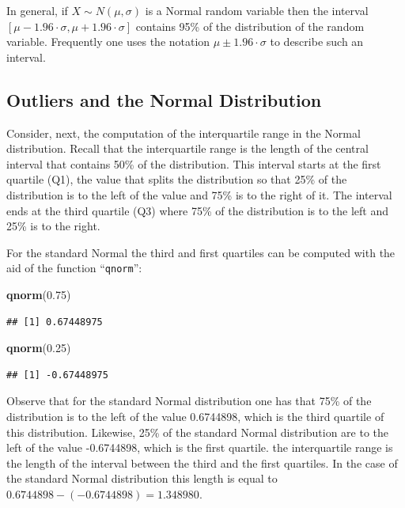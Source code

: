 \documentclass[]{krantz}
\makeatletter
\newenvironment{Shaded}{\begin{snugshade}}{\end{snugshade}}
\newcommand{\FloatTok}[1]{\textcolor[rgb]{0.00,0.00,0.81}{#1}}
\newcommand{\KeywordTok}[1]{\textcolor[rgb]{0.13,0.29,0.53}{\textbf{#1}}}
\newcommand{\NormalTok}[1]{#1}
\newenvironment{kframe}{%
\medskip{}
\setlength{\fboxsep}{.8em}
 \def\at@end@of@kframe{}%
 \ifinner\ifhmode%
  \def\at@end@of@kframe{\end{minipage}}%
  \begin{minipage}{\columnwidth}%
 \fi\fi%
 \def\FrameCommand##1{\hskip\@totalleftmargin \hskip-\fboxsep
 \colorbox{shadecolor}{##1}\hskip-\fboxsep
     \hskip-\linewidth \hskip-\@totalleftmargin \hskip\columnwidth}%
 \MakeFramed {\advance\hsize-\width
   \@totalleftmargin\z@ \linewidth\hsize
   \@setminipage}}%
 {\par\unskip\endMakeFramed%
 \at@end@of@kframe}
\renewenvironment{Shaded}{\begin{kframe}}{\end{kframe}}
\theoremstyle{definition}
\theoremstyle{definition}
\theoremstyle{definition}
\theoremstyle{remark}
\makeatother
\begin{document}
In general, if \(X \sim N(\mu,\sigma)\) is a Normal random variable then
the interval \([\mu - 1.96 \cdot \sigma, \mu + 1.96 \cdot \sigma]\)
contains 95\% of the distribution of the random variable. Frequently one
uses the notation \(\mu \pm 1.96 \cdot \sigma\) to describe such an
interval.

\hypertarget{outliers-and-the-normal-distribution}{%
\subsection{Outliers and the Normal Distribution}\label{outliers-and-the-normal-distribution}}

Consider, next, the computation of the interquartile range in the Normal
distribution. Recall that the interquartile range is the length of the
central interval that contains 50\% of the distribution. This interval
starts at the first quartile (Q1), the value that splits the
distribution so that 25\% of the distribution is to the left of the value
and 75\% is to the right of it. The interval ends at the third quartile
(Q3) where 75\% of the distribution is to the left and 25\% is to the
right.

For the standard Normal the third and first quartiles can be computed
with the aid of the function ``\texttt{qnorm}'':

\begin{Shaded}
\begin{Highlighting}[]
\KeywordTok{qnorm}\NormalTok{(}\FloatTok{0.75}\NormalTok{)}
\end{Highlighting}
\end{Shaded}

\begin{verbatim}
## [1] 0.67448975
\end{verbatim}

\begin{Shaded}
\begin{Highlighting}[]
\KeywordTok{qnorm}\NormalTok{(}\FloatTok{0.25}\NormalTok{)}
\end{Highlighting}
\end{Shaded}

\begin{verbatim}
## [1] -0.67448975
\end{verbatim}

Observe that for the standard Normal distribution one has that 75\% of
the distribution is to the left of the value 0.6744898, which is the
third quartile of this distribution. Likewise, 25\% of the standard
Normal distribution are to the left of the value -0.6744898, which is
the first quartile. the interquartile range is the length of the
interval between the third and the first quartiles. In the case of the
standard Normal distribution this length is equal to
\(0.6744898 - (-0.6744898) = 1.348980\).
\end{document}
